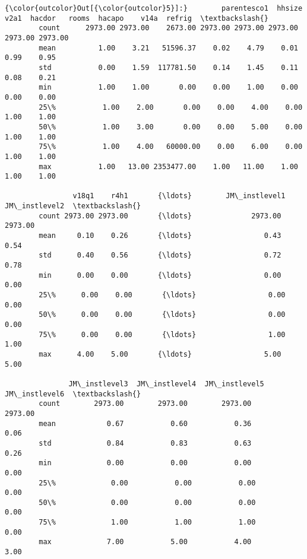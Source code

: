 \documentclass[11pt]{article}
\begin{document}
\begin{Verbatim}[commandchars=\\\{\}]
{\color{outcolor}Out[{\color{outcolor}5}]:}        parentesco1  hhsize       v2a1  hacdor   rooms  hacapo    v14a  refrig  \textbackslash{}
        count      2973.00 2973.00    2673.00 2973.00 2973.00 2973.00 2973.00 2973.00   
        mean          1.00    3.21   51596.37    0.02    4.79    0.01    0.99    0.95   
        std           0.00    1.59  117781.50    0.14    1.45    0.11    0.08    0.21   
        min           1.00    1.00       0.00    0.00    1.00    0.00    0.00    0.00   
        25\%           1.00    2.00       0.00    0.00    4.00    0.00    1.00    1.00   
        50\%           1.00    3.00       0.00    0.00    5.00    0.00    1.00    1.00   
        75\%           1.00    4.00   60000.00    0.00    6.00    0.00    1.00    1.00   
        max           1.00   13.00 2353477.00    1.00   11.00    1.00    1.00    1.00   
        
                v18q1    r4h1       {\ldots}        JM\_instlevel1  JM\_instlevel2  \textbackslash{}
        count 2973.00 2973.00       {\ldots}              2973.00        2973.00   
        mean     0.10    0.26       {\ldots}                 0.43           0.54   
        std      0.40    0.56       {\ldots}                 0.72           0.78   
        min      0.00    0.00       {\ldots}                 0.00           0.00   
        25\%      0.00    0.00       {\ldots}                 0.00           0.00   
        50\%      0.00    0.00       {\ldots}                 0.00           0.00   
        75\%      0.00    0.00       {\ldots}                 1.00           1.00   
        max      4.00    5.00       {\ldots}                 5.00           5.00   
        
               JM\_instlevel3  JM\_instlevel4  JM\_instlevel5  JM\_instlevel6  \textbackslash{}
        count        2973.00        2973.00        2973.00        2973.00   
        mean            0.67           0.60           0.36           0.06   
        std             0.84           0.83           0.63           0.26   
        min             0.00           0.00           0.00           0.00   
        25\%             0.00           0.00           0.00           0.00   
        50\%             0.00           0.00           0.00           0.00   
        75\%             1.00           1.00           1.00           0.00   
        max             7.00           5.00           4.00           3.00   
        

\end{Verbatim}
\end{document}
